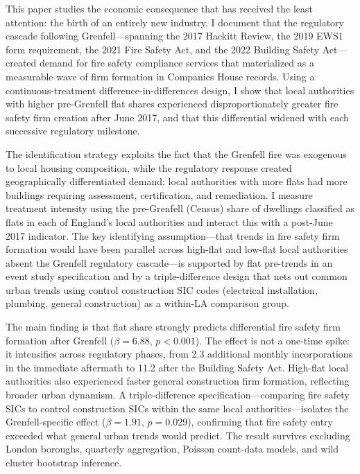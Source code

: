 \documentclass[12pt]{article}
\begin{document}
This paper studies the economic consequence that has received the least attention: the birth of an entirely new industry. I document that the regulatory cascade following Grenfell---spanning the 2017 Hackitt Review, the 2019 EWS1 form requirement, the 2021 Fire Safety Act, and the 2022 Building Safety Act---created demand for fire safety compliance services that materialized as a measurable wave of firm formation in Companies House records. Using a continuous-treatment difference-in-differences design, I show that local authorities with higher pre-Grenfell flat shares experienced disproportionately greater fire safety firm creation after June 2017, and that this differential widened with each successive regulatory milestone.

The identification strategy exploits the fact that the Grenfell fire was exogenous to local housing composition, while the regulatory response created geographically differentiated demand: local authorities with more flats had more buildings requiring assessment, certification, and remediation. I measure treatment intensity using the pre-Grenfell (Census) share of dwellings classified as flats in each of England's local authorities and interact this with a post-June 2017 indicator. The key identifying assumption---that trends in fire safety firm formation would have been parallel across high-flat and low-flat local authorities absent the Grenfell regulatory cascade---is supported by flat pre-trends in an event study specification and by a triple-difference design that nets out common urban trends using control construction SIC codes (electrical installation, plumbing, general construction) as a within-LA comparison group.

The main finding is that flat share strongly predicts differential fire safety firm formation after Grenfell ($\beta = 6.88$, $p < 0.001$). The effect is not a one-time spike: it intensifies across regulatory phases, from 2.3 additional monthly incorporations in the immediate aftermath to 11.2 after the Building Safety Act. High-flat local authorities also experienced faster general construction firm formation, reflecting broader urban dynamism. A triple-difference specification---comparing fire safety SICs to control construction SICs within the same local authorities---isolates the Grenfell-specific effect ($\beta = 1.91$, $p = 0.029$), confirming that fire safety entry exceeded what general urban trends would predict. The result survives excluding London boroughs, quarterly aggregation, Poisson count-data models, and wild cluster bootstrap inference.
\end{document}
